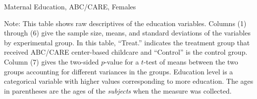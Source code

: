 \documentclass[static]{JJH-Beamer}
\begin{document}
\begin{frame}
 \addtocounter{framenumber}{-1}

\begin{table}[H]
\caption{Maternal Education, ABC/CARE, Females}\label{tab:meducation-females}
\vspace{-4mm}
\begin{center}
\resizebox{\textwidth}{!}{

}
\end{center}
\end{table}
{\flushleft \tiny Note: This table shows raw descriptives of the education variables. Columns (1) through (6) give the sample size, means, and standard deviations of the variables by experimental group. In this table, ``Treat.'' indicates the treatment group that received ABC/CARE center-based childcare and ``Control'' is the control group. Column (7) gives the two-sided $p$-value for a $t$-test of means between the two groups accounting for different variances in the groups. Education level is a categorical variable with higher values corresponding to more education. The ages in parentheses are the ages of the \textit{subjects} when the measure was collected.\\}

\end{frame}
\end{document}
